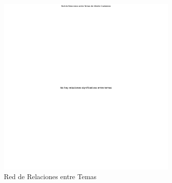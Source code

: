 \documentclass[12pt,a4paper]{article}
\begin{document}
\begin{figure}[H]
    \centering
    \includegraphics[width=0.8\textwidth]{ topic_network.png }
    \caption{ Red de Relaciones entre Temas }
    \label{fig:topic_network}
\end{figure}
\end{document}
